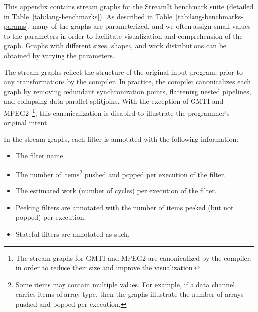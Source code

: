 \label{chap:stream-graphs}

\vspace{-\baselineskip}
This appendix contains stream graphs for the StreamIt benchmark suite
(detailed in Table~\ref{tab:lang-benchmarks}).  As described in
Table~\ref{tab:lang-benchmarks-params}, many of the graphs are
parameterized, and we often assign small values to the parameters in
order to facilitate visualization and comprehension of the graph.
Graphs with different sizes, shapes, and work distributions can be
obtained by varying the parameters.

The stream graphs reflect the structure of the original input program,
prior to any transformations by the compiler.  In practice, the
compiler canonicalizes each graph by removing redundant
synchronization points, flattening nested pipelines, and collapsing
data-parallel splitjoins.  With the exception of GMTI and
MPEG2~\footnote{The stream graphs for GMTI and MPEG2 are canonicalized
  by the compiler, in order to reduce their size and improve the
  visualization.}, this canonicalization is disabled to illustrate the
programmer's original intent.

In the stream graphs, each filter is annotated with the following
information:
\begin{itemize}

\item The filter name.\vspace{-3pt}

\item The number of items\footnote{Some items may contain multiple
  values.  For example, if a data channel carries items of array type,
  then the graphs illustrate the number of arrays pushed and popped
  per execution.} pushed and popped per execution of the filter.\vspace{-3pt}

\item The estimated work (number of cycles) per execution of the filter.\vspace{-3pt}

\item Peeking filters are annotated with the number of items peeked (but not popped) per execution.\vspace{-3pt}

\item Stateful filters are annotated as such.

\end{itemize}

